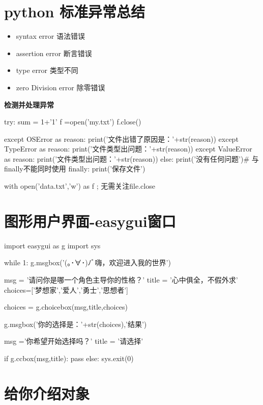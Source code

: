 \documentclass[a4paper,10pt]{ctexart}
\begin{document}
\section{python 标准异常总结}
\begin{itemize}
  \item syntax error 语法错误
  \item assertion error 断言错误
  \item type error  类型不同
  \item zero Division error 除零错误
\end{itemize}

\textbf{检测并处理异常}\\

\begin{python}
try:
      sum = 1+'1'
      f =open('my.txt')
      f.close()

except OSError as reason:
      print('文件出错了原因是：'+str(reason))
except TypeError as reason:
      print('文件类型出问题：'+str(reason))
except ValueError as reason:
      print('文件类型出问题：'+str(reason))
else:
     print('没有任何问题')# 与finally不能同时使用
finally:
      print('保存文件')
\end{python}

with open('data.txt','w') as f ;  无需关注file.close


\section{图形用户界面-easygui窗口}

\begin{python}
import easygui as g
import sys

while 1:
g.msgbox('(｡･∀･)ﾉﾞ嗨，欢迎进入我的世界')

msg  = '请问你是哪一个角色主导你的性格？'
title = '心中俱全，不假外求'
choices=['梦想家','爱人','勇士','思想者']

choices = g.choicebox(msg,title,choices)

g.msgbox('你的选择是：'+str(choices),'结果')

msg ='你希望开始选择吗？'
title = '请选择'

if g.ccbox(msg,title):
pass
else:
sys.exit(0)	
		
	
\end{python}

\section{给你介绍对象}
\end{document}
